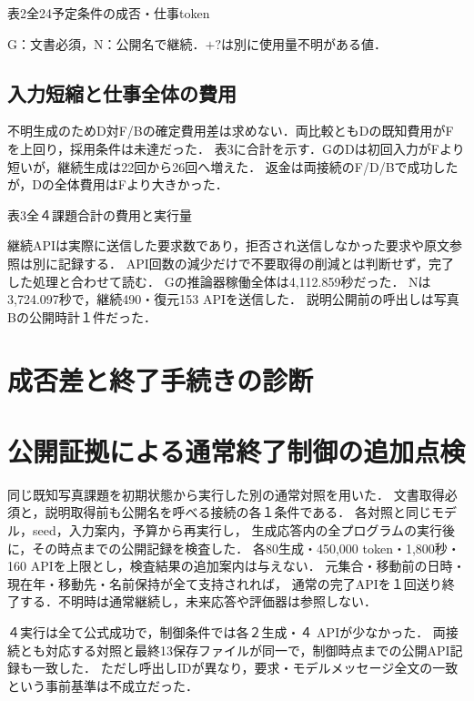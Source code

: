 \documentclass[uplatex,a4paper,twocolumn,10pt]{jsarticle}
\begin{document}
\begin{center}\begin{minipage}{\columnwidth}\centering
\small 表2\quad 全24予定条件の成否・仕事token\par\smallskip
\PublicDisplayAllCells
\par\smallskip\footnotesize G：文書必須，N：公開名で継続．$+?$は別に使用量不明がある値．
\end{minipage}\end{center}

\subsection{入力短縮と仕事全体の費用}
不明生成のためD対F/Bの確定費用差は求めない．両比較ともDの既知費用がFを上回り，採用条件は未達だった．
表3に合計を示す．GのDは初回入力がFより短いが，継続生成は22回から26回へ増えた．
返金は両接続のF/D/Bで成功したが，Dの全体費用はFより大きかった．

\begin{center}\begin{minipage}{\columnwidth}\centering
\small 表3\quad 全４課題合計の費用と実行量\par\smallskip
\PublicDisplayTotals
\end{minipage}\end{center}

継続APIは実際に送信した要求数であり，拒否され送信しなかった要求や原文参照は別に記録する．
API回数の減少だけで不要取得の削減とは判断せず，完了した処理と合わせて読む．
Gの推論器稼働全体は4,112.859秒だった．
Nは3,724.097秒で，継続490・復元153 APIを送信した．
説明公開前の呼出しは写真Bの公開時計１件だった．

\section{成否差と終了手続きの診断}


\section{公開証拠による通常終了制御の追加点検}
同じ既知写真課題を初期状態から実行した別の通常対照を用いた．
文書取得必須と，説明取得前も公開名を呼べる接続の各１条件である．
各対照と同じモデル，seed，入力案内，予算から再実行し，
生成応答内の全プログラムの実行後に，その時点までの公開記録を検査した．
各80生成・450,000 token・1,800秒・160 APIを上限とし，検査結果の追加案内は与えない．
元集合・移動前の日時・現在年・移動先・名前保持が全て支持されれば，
通常の完了APIを１回送り終了する．不明時は通常継続し，未来応答や評価器は参照しない．

４実行は全て公式成功で，制御条件では各２生成・４ APIが少なかった．
両接続とも対応する対照と最終13保存ファイルが同一で，制御時点までの公開API記録も一致した．
ただし呼出しIDが異なり，要求・モデルメッセージ全文の一致という事前基準は不成立だった．
\end{document}
